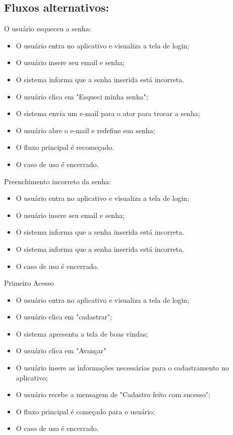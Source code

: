 \subsection{Fluxos alternativos:}
O usuário esqueceu a senha:
\begin{itemize}
    \item O usuário entra no aplicativo e visualiza a tela de login;
    \item O usuário insere seu email e senha;
    \item O sistema informa que a senha inserida está incorreta.
    \item O usuário clica em "Esqueci minha senha";
    \item O sistema envia um e-mail para o ator para trocar a senha;
    \item O usuário abre o e-mail e redefine sua senha;
    \item O fluxo principal é recomeçado. 
    \item O caso de uso é encerrado. 
\end{itemize}
 Preenchimento incorreto da senha:
 \begin{itemize}
     \item O usuário entra no aplicativo e visualiza a tela de login;
     \item O usuário insere seu email e senha;
     \item O sistema informa que a senha inserida está incorreta.
     \item O sistema informa que a senha inserida está incorreta.
     \item O caso de uso é encerrado. 
 \end{itemize}
 Primeiro Acesso
 \begin{itemize}
     \item O usuário entra no aplicativo e visualiza a tela de login;
     \item O usuário clica em "cadastrar";
     \item O sistema apresenta a tela de boas vindas;
     \item O usuário clica em "Avançar"
     \item O usuário insere as informações necessárias para o cadastramento no aplicativo;
     \item O usuário recebe a mensagem de "Cadastro feito com sucesso";
     \item O fluxo principal é começado para o usuário;
     \item O caso de uso é encerrado.
 \end{itemize}

